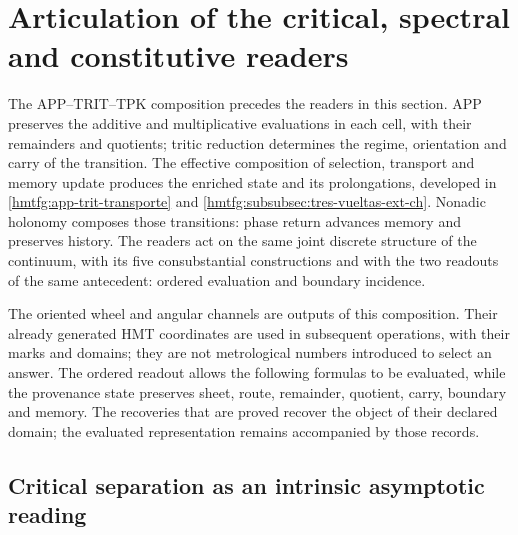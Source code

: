 \section{Articulation of the critical, spectral and constitutive readers}
\label{hmtfg:articulacion:seccion}

The APP--TRIT--TPK composition precedes the readers in this section.
APP preserves the additive and multiplicative evaluations in each cell,
with their remainders and quotients; tritic reduction determines the regime,
orientation and carry of the transition. The effective composition
of selection, transport and memory update produces the enriched
state and its prolongations, developed in
\ref{hmtfg:app-trit-transporte} and
\ref{hmtfg:subsubsec:tres-vueltas-ext-ch}.
Nonadic holonomy composes those transitions: phase return
advances memory and preserves history. The readers act on the
same joint discrete structure of the continuum, with its five
consubstantial constructions and with the two readouts of the same
antecedent: ordered evaluation and boundary incidence.

The oriented wheel and angular channels are outputs of this
composition. Their already generated HMT coordinates are used in subsequent
operations, with their marks and domains; they are not metrological numbers
introduced to select an answer. The ordered readout
allows the following formulas to be evaluated, while the provenance state
preserves sheet, route, remainder, quotient, carry, boundary and memory.
The recoveries that are proved recover the object of their declared
domain; the evaluated representation remains accompanied by those
records.

\subsection{Critical separation as an intrinsic asymptotic reading}
\label{hmtfg:articulacion:separacion}

